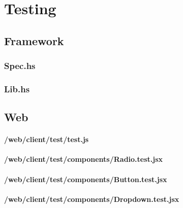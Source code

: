 \chapter{Testing}
\label{app:testing}

\section{Framework}\label{app:testing_framework}

\subsection{Spec.hs}\label{app:testing_spec_hs}


\subsection{Lib.hs}\label{app:testing_lib_hs}




\section{Web}
\label{app:testing_web}

\subsubsection{/web/client/test/test.js}
\label{app:web_test_js}


\subsubsection{/web/client/test/components/Radio.test.jsx}
\label{app:web_Radio_test_jsx}


\subsubsection{/web/client/test/components/Button.test.jsx}
\label{app:web_Button_test_jsx}


\subsubsection{/web/client/test/components/Dropdown.test.jsx}
\label{app:web_Dropdown_test_jsx}

